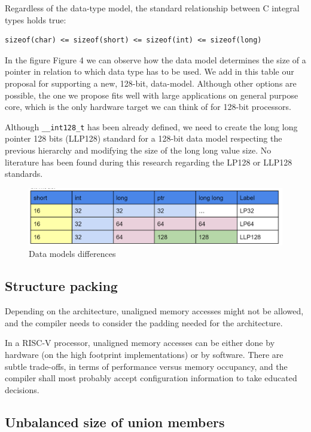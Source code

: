 \documentclass[a4paper,conference]{IEEEtran}
\newcommand{\riscv}{\textsc{\small RISC-V}\xspace}
\begin{document}
Regardless of the data-type model, the standard relationship between C integral types holds true:
\begin{verbatim}
sizeof(char) <= sizeof(short) <= sizeof(int) <= sizeof(long)
\end{verbatim}

In the figure Figure 4 we can observe how the data model determines the size of a pointer in relation to which data type has to be used.
We add in this table our proposal for supporting a new, 128-bit, data-model.
Although other options are possible, the one we propose fits well with large applications on general purpose core, which is the only hardware target we can think of for 128-bit processors.

Although \texttt{__int128_t} has been already defined, we need to create the long long pointer 128 bits (LLP128) standard for a 128-bit data model respecting the previous hierarchy and modifying the size of the long long value size. No literature has been found during this research regarding the LP128 or LLP128 standards.

\label{sec:di}
\begin{figure}[hbtp]\center\leavevmode
	\includegraphics[width=1\linewidth]{dataModels}
	\caption{Data models differences}
	\label{fig:dataModels}
\end{figure}

\subsection{Structure packing}

Depending on the architecture, unaligned memory accesses might not be allowed, and the compiler needs to consider the padding needed for the architecture.

In a \riscv processor, unaligned memory accesses can be either done by hardware (on the high footprint implementations) or by software.
There are subtle trade-offs, in terms of performance versus memory occupancy, and the compiler shall most probably accept configuration information to take educated decisions.


\subsection{Unbalanced size of union members}
\end{document}
